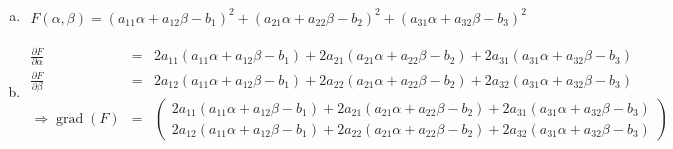 \documentclass[11pt]{article} %
\begin{document}
\begin{enumerate}[a)]

\item
\begin{eqnarray*}
F(\alpha, \beta) = (a_{11}\alpha + a_{12}\beta - b_1)^2+(a_{21}\alpha + a_{22}\beta - b_2)^2+(a_{31}\alpha + a_{32}\beta - b_3)^2
\end{eqnarray*}

\item
\begin{eqnarray*}
\frac{\partial F}{\partial\alpha} &=& 2a_{11}(a_{11}\alpha + a_{12}\beta - b_1) + 2a_{21}(a_{21}\alpha + a_{22}\beta - b_2) + 2a_{31}(a_{31}\alpha + a_{32}\beta - b_3) \\
\frac{\partial F}{\partial\beta} &=& 2a_{12}(a_{11}\alpha + a_{12}\beta - b_1) + 2a_{22}(a_{21}\alpha + a_{22}\beta - b_2) + 2a_{32}(a_{31}\alpha + a_{32}\beta - b_3) \\
\Rightarrow \operatorname{grad}(F) &=& \begin{pmatrix}
2a_{11}(a_{11}\alpha + a_{12}\beta - b_1) + 2a_{21}(a_{21}\alpha + a_{22}\beta - b_2) + 2a_{31}(a_{31}\alpha + a_{32}\beta - b_3) \\
2a_{12}(a_{11}\alpha + a_{12}\beta - b_1) + 2a_{22}(a_{21}\alpha + a_{22}\beta - b_2) + 2a_{32}(a_{31}\alpha + a_{32}\beta - b_3)
\end{pmatrix}
\end{eqnarray*}


\end{enumerate}
\end{document}

